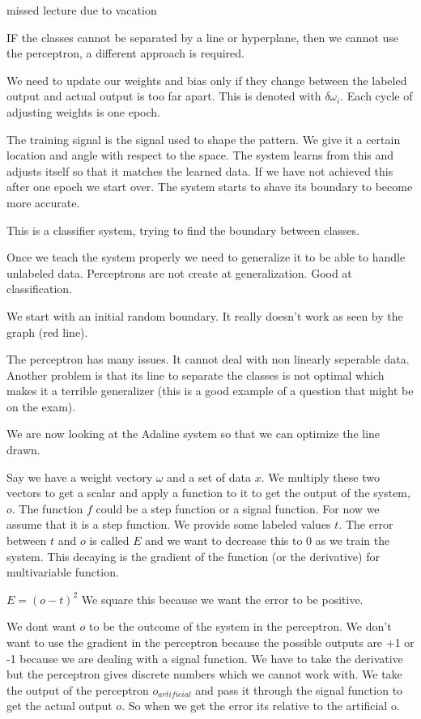 \documentclass{article}
\begin{document}
missed lecture due to vacation

IF the classes cannot be separated by a line or hyperplane, then we cannot use the perceptron, a different approach is required.


We need to update our weights and bias only if they change between the labeled output and actual output is too far apart. This is denoted with $\delta\omega_i$. Each cycle of adjusting weights is one epoch.

The training signal is the signal used to shape the pattern. We give it a certain location and angle with respect to the space. The system learns from this and adjusts itself so that it matches the learned data. If we have not achieved this after one epoch we start over. The system starts to shave its boundary to become more accurate.

This is a classifier system, trying to find the boundary between classes.


Once we teach the system properly we need to generalize it to be able to handle unlabeled data. Perceptrons are not create at generalization. Good at classification.

We start with an initial random boundary. It really doesn't work as seen by the graph (red line).


The perceptron has many issues. It cannot deal with non linearly seperable data. Another problem is that its line to separate the classes is not optimal which makes it a terrible generalizer (this is a good example of a question that might be on the exam).


We are now looking at the Adaline system so that we can optimize the line drawn.

Say we have a weight vectory $\omega$ and a set of data $x$. We multiply these two vectors to get a scalar and apply a function to it to get the output of the system, $o$. The function $f$ could be a step function or a signal function. For now we assume that it is a step function. We provide some labeled values $t$. The error between $t$ and $o$ is called $E$ and we want to decrease this to 0 as we train the system. This decaying is the gradient of the function (or the derivative) for multivariable function.

$E = (o-t)^2$ We square this because we want the error to be positive.

We dont want $o$ to be the outcome of the system in the perceptron. We don't want to use the gradient in the perceptron because the possible outputs are +1 or -1 because we are dealing with a signal function. We have to take the derivative but the perceptron gives discrete numbers which we cannot work with. We take the output of the perceptron $o_{artificial}$ and pass it through the signal function to get the actual output $o$. So when we get the error its relative to the artificial o.
\end{document}
